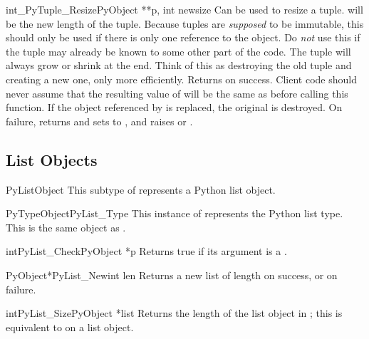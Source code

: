\documentclass{manual}
\begin{document}
\begin{cfuncdesc}{int}{_PyTuple_Resize}{PyObject **p, int newsize}
Can be used to resize a tuple.   will be the new length
of the tuple.  Because tuples are \emph{supposed} to be immutable,
this should only be used if there is only one reference to the object.
Do \emph{not} use this if the tuple may already be known to some other
part of the code.  The tuple will always grow or shrink at the end.
Think of this as destroying the old tuple and creating a new one, only
more efficiently.  Returns  on success.  Client code should
never assume that the resulting value of  will be the
same as before calling this function.  If the object referenced by
 is replaced, the original  is
destroyed.  On failure, returns  and sets  to
\NULL, and raises  or .
\end{cfuncdesc}


\subsection{List Objects \label{listObjects}}

\begin{ctypedesc}{PyListObject}
This subtype of  represents a Python list object.
\end{ctypedesc}

\begin{cvardesc}{PyTypeObject}{PyList_Type}
This instance of  represents the Python list
type.  This is the same object as .
\end{cvardesc}

\begin{cfuncdesc}{int}{PyList_Check}{PyObject *p}
Returns true if its argument is a .
\end{cfuncdesc}

\begin{cfuncdesc}{PyObject*}{PyList_New}{int len}
Returns a new list of length  on success, or \NULL{} on
failure.
\end{cfuncdesc}

\begin{cfuncdesc}{int}{PyList_Size}{PyObject *list}
Returns the length of the list object in ; this is
equivalent to  on a list object.
\end{cfuncdesc}
\end{document}
